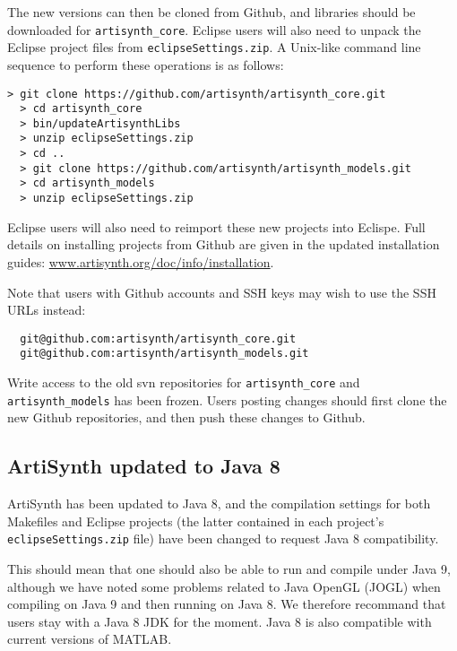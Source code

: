\documentclass{article}
\begin{document}
The new versions can then be cloned from Github, and libraries should
be downloaded for {\tt artisynth\_core}. Eclipse users will also need
to unpack the Eclipse project files from {\tt eclipseSettings.zip}.
A Unix-like command line sequence to perform these operations
is as follows:
%
\begin{lstlisting}[]
  > git clone https://github.com/artisynth/artisynth_core.git 
  > cd artisynth_core
  > bin/updateArtisynthLibs
  > unzip eclipseSettings.zip
  > cd ..
  > git clone https://github.com/artisynth/artisynth_models.git 
  > cd artisynth_models
  > unzip eclipseSettings.zip
\end{lstlisting}
%
Eclipse users will also need to reimport these new projects into
Eclispe. Full details on installing projects from Github are given in
the updated installation guides:
\href{http://www.artisynth.org/doc/info/installation}%
{www.artisynth.org/doc/info/installation}.

\begin{sideblock}
Note that users with Github accounts and SSH keys may wish to use the
SSH URLs instead:
%
\begin{verbatim}
  git@github.com:artisynth/artisynth_core.git
  git@github.com:artisynth/artisynth_models.git
\end{verbatim}
%
\end{sideblock}

\begin{sideblock}
Write access to the old svn repositories for {\tt artisynth\_core} and
{\tt artisynth\_models} has been frozen. Users posting changes should
first clone the new Github repositories, and then push these changes
to Github.
\end{sideblock}

\subsection*{ArtiSynth updated to Java 8}

ArtiSynth has been updated to Java 8, and the compilation settings for
both Makefiles and Eclipse projects (the latter contained in each
project's {\tt eclipseSettings.zip} file) have been changed to request
Java 8 compatibility. 

This should mean that one should also be able to run and compile under
Java 9, although we have noted some problems related to Java OpenGL
(JOGL) when compiling on Java 9 and then running on Java 8.  We
therefore recommand that users stay with a Java 8 JDK for the
moment. Java 8 is also compatible with current versions of MATLAB.
\end{document}
